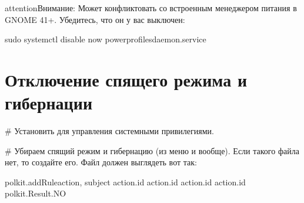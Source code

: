 \documentclass[letterpaper,10pt,russian,openany]{sphinxmanual}
\begin{document}
\begin{sphinxadmonition}{attention}{Внимание:}
\sphinxAtStartPar
Может конфликтовать со встроенным менеджером питания в GNOME 41+.
Убедитесь, что он у вас выключен:

\begin{sphinxVerbatim}[commandchars=\\\{\}]
sudo systemctl disable \PYGZhy{}\PYGZhy{}now power\PYGZhy{}profiles\PYGZhy{}daemon.service
\end{sphinxVerbatim}
\end{sphinxadmonition}

\ignorespaces 

\section{Отключение спящего режима и гибернации}
\label{\detokenize{source/extra-optimizations:disabling-hibernation-and-sleep}}\label{\detokenize{source/extra-optimizations:index-3}}\label{\detokenize{source/extra-optimizations:id4}}
\sphinxAtStartPar
{}  \# Установить для управления системными привилегиями.

\sphinxAtStartPar
{}  \# Убираем спящий режим и гибернацию (из меню и вообще).
Если такого файла нет, то создайте его. Файл должен выглядеть вот так:

\begin{sphinxVerbatim}[commandchars=\\\{\}]
polkit.addRuleaction, subject 
   action.id   
      action.id   
      action.id   
      action.id  
       polkit.Result.NO
\end{sphinxVerbatim}
\end{document}

